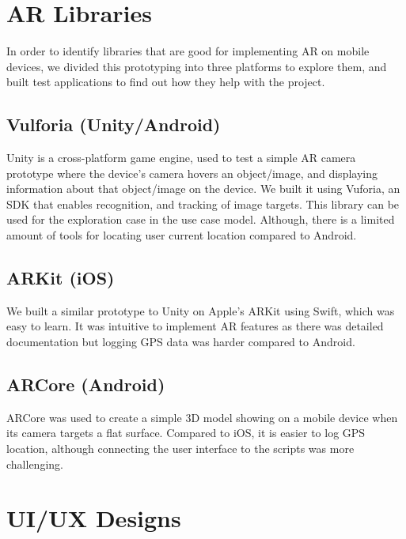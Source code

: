 
\section{AR Libraries}
In order to identify libraries that are good for implementing AR on mobile devices, we divided this prototyping into three platforms to explore them, and built test applications to find out how they help with the project.

\subsection*{Vulforia (Unity/Android)}
Unity is a cross-platform game engine, used to test a simple AR camera prototype where the device's camera hovers an object/image, and displaying information about that object/image on the device. We built it using Vuforia, an SDK that enables recognition, and tracking of image targets. This library can be used for the exploration case in the use case model. Although, there is a limited amount of tools for locating user current location compared to Android.

\subsection*{ARKit (iOS)}
We built a similar prototype to Unity on Apple's ARKit using Swift, which was easy to learn. It was intuitive to implement AR features as there was detailed documentation but logging GPS data was harder compared to Android.

\subsection*{ARCore (Android)}
ARCore was used to create a simple 3D model showing on a mobile device when its camera targets a flat surface. Compared to iOS, it is easier to log GPS location, although connecting the user interface to the scripts was more challenging.

\section{UI/UX Designs}